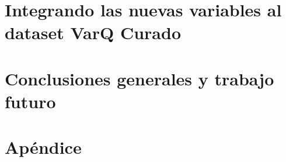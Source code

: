 \documentclass[11pt,a4paper,twoside]{tesis}
\begin{document}
\chapter{Integrando las nuevas variables al dataset VarQ Curado}
\label{ch:desarrollo_integral_varq}


\chapter{Conclusiones generales y trabajo futuro}
\label{ch:conclusiones}



\backmatter





\chapter{Apéndice}
\label{ch:apendice}

\end{document}
